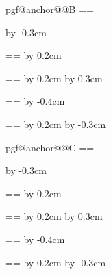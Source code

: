 {{    %
    \csname pgf@anchor@\shape@name @B\endcsname
    \pgf@xa=\pgf@x \pgf@ya=\pgf@y
    \pgfpathmoveto{\pgfpoint{\pgf@x}{\pgf@y}}

    \advance\pgf@xa by -0.3cm
    \pgfpathlineto{\pgfpoint{\pgf@xa}{\pgf@ya}}
    
    \pgf@xb=\pgf@xa \pgf@yb=\pgf@ya
    \advance\pgf@yb by 0.2cm
    \pgfpathlineto{\pgfpoint{\pgf@xb}{\pgf@yb}}
    
    \pgf@xc=\pgf@xb \pgf@yc=\pgf@yb
    \advance\pgf@xc by 0.2cm
    \advance\pgf@yc by 0.3cm
    \pgfpathlineto{\pgfpoint{\pgf@xc}{\pgf@yc}}

    \pgf@xa=\pgf@xc \pgf@ya=\pgf@yc
    \advance\pgf@xa by -0.4cm
    \pgfpathlineto{\pgfpoint{\pgf@xa}{\pgf@ya}}
    
    \pgf@xb=\pgf@xa \pgf@yb=\pgf@ya
    \advance\pgf@xb by 0.2cm
    \advance\pgf@yb by -0.3cm
    \pgfpathlineto{\pgfpoint{\pgf@xb}{\pgf@yb}}
    

    \csname pgf@anchor@\shape@name @C\endcsname
    \pgf@xa=\pgf@x \pgf@ya=\pgf@y
    \pgfpathmoveto{\pgfpoint{\pgf@x}{\pgf@y}}

    \advance\pgf@xa by -0.3cm
    \pgfpathlineto{\pgfpoint{\pgf@xa}{\pgf@ya}}
    
    \pgf@xb=\pgf@xa \pgf@yb=\pgf@ya
    \advance\pgf@yb by 0.2cm
    \pgfpathlineto{\pgfpoint{\pgf@xb}{\pgf@yb}}
    
    \pgf@xc=\pgf@xb \pgf@yc=\pgf@yb
    \advance\pgf@xc by 0.2cm
    \advance\pgf@yc by 0.3cm
    \pgfpathlineto{\pgfpoint{\pgf@xc}{\pgf@yc}}

    \pgf@xa=\pgf@xc \pgf@ya=\pgf@yc
    \advance\pgf@xa by -0.4cm
    \pgfpathlineto{\pgfpoint{\pgf@xa}{\pgf@ya}}
    
    \pgf@xb=\pgf@xa \pgf@yb=\pgf@ya
    \advance\pgf@xb by 0.2cm
    \advance\pgf@yb by -0.3cm
    \pgfpathlineto{\pgfpoint{\pgf@xb}{\pgf@yb}}

  }
}



\makeatother


